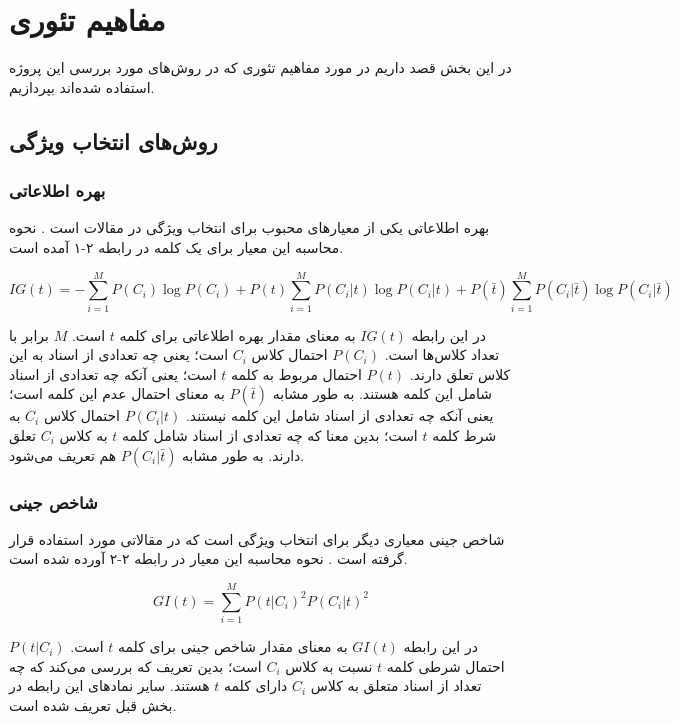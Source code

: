\chapter{مفاهیم تئوری}
در این بخش قصد داریم در مورد مفاهیم تئوری که در روش‌های مورد بررسی این پروژه استفاده شده‌اند بپردازیم.


\section{روش‌های انتخاب ویژگی}

\subsection{بهره اطلاعاتی}
بهره اطلاعاتی
یکی از معیارهای محبوب برای انتخاب ویژگی در مقالات است
\cite{labani2018novel}\cite{uysal2016improved}.
نحوه محاسبه این معیار برای یک کلمه در رابطه ۲-۱ آمده است.

\begin{equation}
IG(t) = -\sum_{i=1}^M P(C_i)\log{P(C_i)} + P(t)\sum_{i=1}^M P(C_i|t)\log{P(C_i|t)} + P(\bar{t})\sum_{i=1}^M P(C_i|\bar{t})\log{P(C_i|\bar{t})}
\end{equation}

در این رابطه
$IG(t)$
به معنای مقدار بهره اطلاعاتی برای کلمه
$t$
است. 
$M$
  برابر با تعداد کلاس‌ها است.
$P(C_i)$
احتمال کلاس
$C_i$
است؛ یعنی چه تعدادی از اسناد به این کلاس تعلق دارند.
$P(t)$
احتمال مربوط به کلمه
$t$
است؛ یعنی آنکه چه تعدادی از اسناد شامل این کلمه هستند. به طور مشابه 
$P(\bar{t})$
به معنای احتمال عدم این کلمه است؛ یعنی آنکه چه تعدادی از اسناد شامل این کلمه نیستند.
$P(C_i|t)$
احتمال کلاس
$C_i$
به شرط کلمه
$t$
است؛ بدین معنا که چه تعدادی از اسناد شامل کلمه
$t$
به کلاس
$C_i$
تعلق دارند.
به طور مشابه
$P(C_i|\bar{t})$
هم تعریف می‌شود.

\subsection{شاخص جینی}
 شاخص جینی
معیاری دیگر برای انتخاب ویژگی است که در مقالاتی مورد استفاده قرار گرفته است
\cite{labani2018novel}\cite{uysal2016improved}.
نحوه محاسبه این معیار در رابطه ۲-۲ آورده شده است.

\begin{equation}
GI(t) = \sum_{i=1}^M P(t|C_i)^2 P(C_i|t)^2
\end{equation}

در این رابطه 
$GI(t)$
به معنای مقدار شاخص جینی برای کلمه
$t$
است. 
$P(t|C_i)$
احتمال شرطی کلمه 
$t$
نسبت به کلاس
$C_i$
است؛ بدین تعریف که بررسی می‌کند که چه تعداد از اسناد متعلق به کلاس 
$C_i$
دارای کلمه
$t$
هستند. سایر نماد‌های این رابطه در بخش قبل تعریف شده است.

